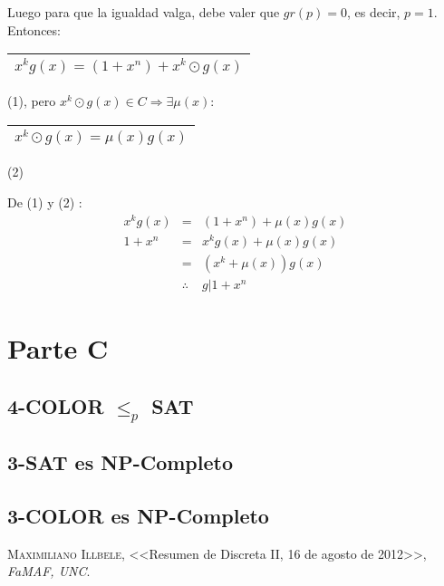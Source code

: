 \documentclass[12pt,a4paper]{report}
\begin{document}
		Luego para que la igualdad valga, debe valer que $gr(p)	= 0$, es decir, $p = 1$. Entonces: \begin{tabular}{|c|} \hline $ x^{k} g(x) = (1 + x^{n}) + x^{k} \odot g(x) $ \\ \hline \end{tabular} (1), pero $x^{k} \odot g(x) \in C \Rightarrow \exists \mu(x) :$ \begin{tabular}{|c|} \hline $ x^{k} \odot g(x) = \mu(x) g(x) $ \\ \hline \end{tabular} (2)
		
		\vspace{3mm}
		De (1) y (2)	:
		\begin{eqnarray}
			\nonumber x^{k} g(x) &=& (1 + x^{n}) + \mu(x) g(x) \\
			\nonumber 1 + x^{n} &=& x^{k} g(x) + \mu(x) g(x) \\
			\nonumber &=& (x^{k} + \mu(x)) g(x) \\
			\nonumber & \therefore & g | 1 + x^{n}
		\end{eqnarray}

\chapter{Parte C}

	\section{4-COLOR $\leq_{\textit{p}}$ SAT}
	
	\section{3-SAT es NP-Completo}
	
	\section{3-COLOR es NP-Completo}
	
	
\begin{thebibliography}{X}
 \textsc{Maximiliano Illbele},
<<Resumen de Discreta II, 16 de agosto de 2012>>,
\textit{FaMAF, UNC}.
\end{thebibliography}
\end{document}

